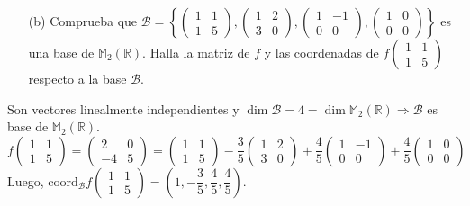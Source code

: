 \documentclass[11pt,a4paper]{article}
\newcommand{\R}{\mathbb R}
\begin{document}
\begin{itemize}\item[(b)] Comprueba que $\mathcal B=\left\{\begin{pmatrix}1&1\\1&5\end{pmatrix}, \begin{pmatrix}1&2\\3&0\end{pmatrix}, \begin{pmatrix}1&-1\\0&0\end{pmatrix}, \begin{pmatrix}1&0\\0&0\end{pmatrix}\right\}$ es una base de $\mathbb M_2(\R)$. Halla la matriz de $f$ y las coordenadas de $f\begin{pmatrix}1&1\\1&5\end{pmatrix}$ respecto a la base $\mathcal B$.\end{itemize}
Son vectores linealmente independientes y $\dim \mathcal B=4=\dim \mathbb M_2(\R)\Rightarrow \mathcal B$ es base de $\mathbb M_2(\R)$.\\
\[
f\begin{pmatrix}1&1\\1&5\end{pmatrix}=\begin{pmatrix}2&0\\-4&5\end{pmatrix}=\begin{pmatrix}1&1\\1&5\end{pmatrix}-\dfrac{3}{5}\begin{pmatrix}1&2\\3&0\end{pmatrix}+\dfrac{4}{5}\begin{pmatrix}1&-1\\0&0\end{pmatrix}+\dfrac{4}{5}\begin{pmatrix}1&0\\0&0\end{pmatrix}
\]
Luego, $\text{coord}_{\mathcal B}f\begin{pmatrix}1&1\\1&5\end{pmatrix}=\left(1,-\dfrac{3}{5},\dfrac{4}{5},\dfrac{4}{5}\right)$.\\
\end{document}
